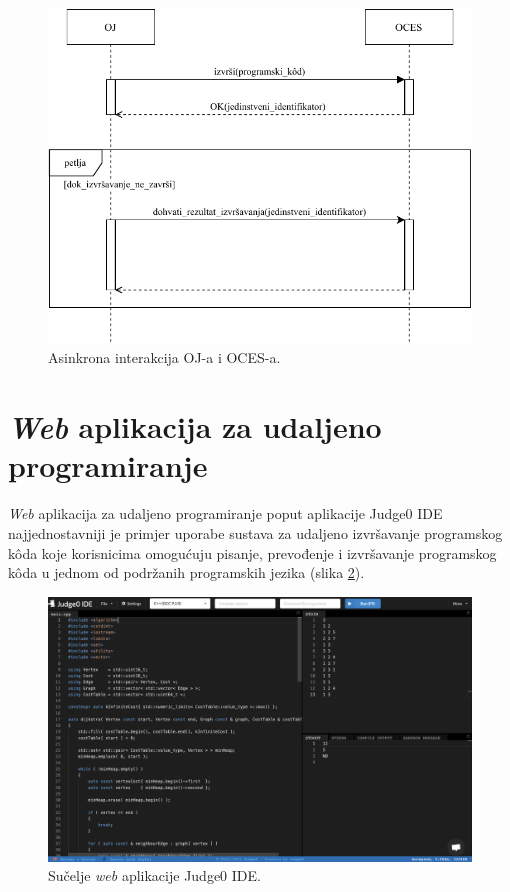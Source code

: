 \documentclass[times, utf8, diplomski]{fer}
\begin{document}
\

\begin{figure}[htb]
	\centering
	\includegraphics[width=\textwidth]{images/Async Interakcija.pdf}
	\caption{
		Asinkrona interakcija OJ-a i OCES-a.
	}
	\label{fig:async-interaction}
\end{figure}

\pagebreak

\section{\textit{Web} aplikacija za udaljeno programiranje}
\textit{Web} aplikacija za udaljeno programiranje poput aplikacije Judge0 IDE \citep{Judge0IDE} najjednostavniji je primjer uporabe sustava za udaljeno izvršavanje programskog kôda koje korisnicima omogućuju pisanje, prevođenje i izvršavanje programskog kôda u jednom od podržanih programskih jezika (slika \ref{fig:judge0-ide-ui}).

\begin{figure}[htb]
	\centering
	\includegraphics[width=\textwidth]{images/Judge0 IDE UI.png}
	\caption{
		Sučelje \textit{web} aplikacije Judge0 IDE.
	}
	\label{fig:judge0-ide-ui}
\end{figure}
\end{document}
